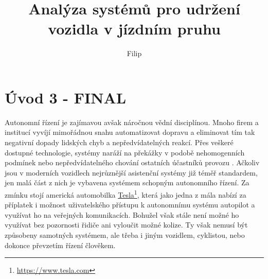 \documentclass[czech, bc, kky, he, iso690alph]{fasthesis}
\title{Analýza systémů pro udržení vozidla v jízdním pruhu}
\author{Filip}{Jašek}{}{}
\begin{document}
    \frontpages[tm] %
    \tableofcontents
    \makeatletter%
    \ifx\FASThesis@style\c@fullcolor%
    \else%
    \fi%
    \makeatother%
	\chapter{Úvod 3 - FINAL}
		Autonomní řízení je zajímavou avšak náročnou vědní disciplínou. Mnoho firem a institucí vyvíjí mimořádnou snahu automatizovat dopravu a eliminovat tím tak negativní dopady lidských chyb a nepředvídatelných reakcí. Přes veškeré dostupné technologie, systémy naráží na překážky v podobě nehomogenních podmínek \cite{VIOLET} nebo nepředvídatelného chování ostatních účastníků provozu \cite{AV_crashes_involved_vulnerable, AV_vs_CV_crashes}. Ačkoliv jsou v moderních vozidlech nejrůznější asistenční systémy již téměř standardem, jen malá část z nich je vybavena systémem schopným autonomního řízení. Za zmínku stojí americká automobilka \href{https://www.tesla.com}{Tesla}\footnote{\href{https://www.tesla.com}{https://www.tesla.com}}, která jako jedna z mála nabízí za příplatek i možnost uživatelského přístupu k autonomnímu systému autopilot a využívat ho na veřejných komunikacích. Bohužel však stále není možné ho využívat bez pozornosti řidiče ani vyloučit možné kolize. Ty však nemusí být způsobeny samotných systémem, ale třeba i jiným vozidlem, cyklistou, nebo dokonce převzetím řízení člověkem.
		
\end{document}
